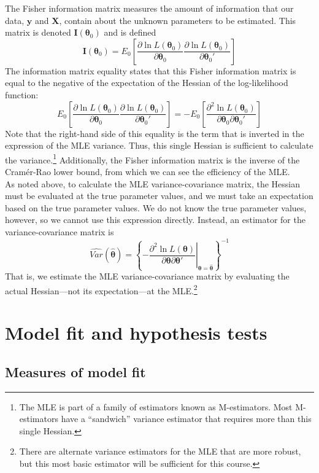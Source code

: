 \documentclass[11pt,letterpaper]{article}
\begin{document}
\noindent The Fisher information matrix measures the amount of information that our data, $\bm{y}$ and $\bm{X}$, contain about the unknown parameters to be estimated. This matrix is denoted $\bm{I}(\bm{\theta}_0)$ and is defined
$$\bm{I}(\bm{\theta}_0) = E_0 \left[ \frac{\partial \ln L(\bm{\theta}_0)}{\partial \bm{\theta}_0} \frac{\partial \ln L(\bm{\theta}_0)}{\partial \bm{\theta}_0'} \right]$$
The information matrix equality states that this Fisher information matrix is equal to the negative of the expectation of the Hessian of the log-likelihood function:
$$E_0 \left[ \frac{\partial \ln L(\bm{\theta}_0)}{\partial \bm{\theta}_0} \frac{\partial \ln L(\bm{\theta}_0)}{\partial \bm{\theta}_0'} \right] = -E_0 \left[ \frac{\partial^2 \ln L(\bm{\theta}_0)}{\partial \bm{\theta}_0 \partial \bm{\theta}_0'} \right]$$
Note that the right-hand side of this equality is the term that is inverted in the expression of the MLE variance. Thus, this single Hessian is sufficient to calculate the variance.\footnote{The MLE is part of a family of estimators known as M-estimators. Most M-estimators have a ``sandwich'' variance estimator that requires more than this single Hessian.} Additionally, the Fisher information matrix is the inverse of the Cram\'er-Rao lower bound, from which we can see the efficiency of the MLE. \\

\noindent As noted above, to calculate the MLE variance-covariance matrix, the Hessian must be evaluated at the true parameter values, and we must take an expectation based on the true parameter values. We do not know the true parameter values, however, so we cannot use this expression directly. Instead, an estimator for the variance-covariance matrix is
$$\widehat{Var}(\widehat{\bm{\theta}}) = \left\{ \left. -\frac{\partial^2 \ln L(\bm{\theta})}{\partial \bm{\theta} \partial \bm{\theta}'} \right\vert_{\bm{\theta} = \widehat{\bm{\theta}}} \right\}^{-1}$$
That is, we estimate the MLE variance-covariance matrix by evaluating the actual Hessian---not its expectation---at the MLE.\footnote{There are alternate variance estimators for the MLE that are more robust, but this most basic estimator will be sufficient for this course.}

\section{Model fit and hypothesis tests}

\subsection{Measures of model fit}
\end{document}

